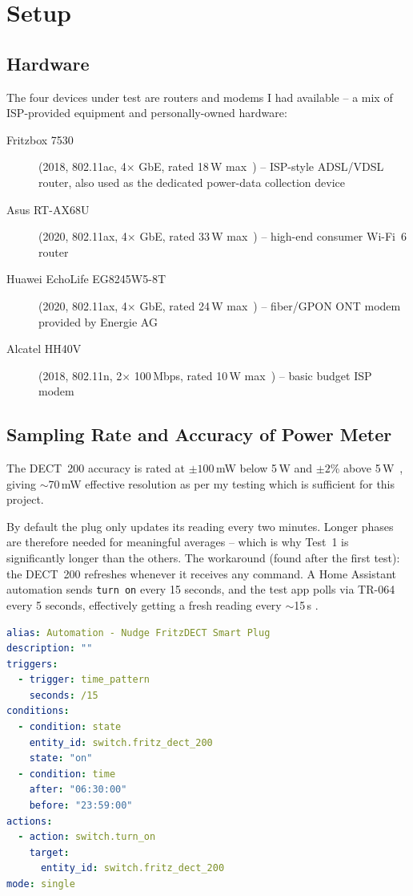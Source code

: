 \documentclass[a4paper,oneside,10pt,ngerman,english]{scrartcl}
\begin{document}
\section{Setup}
\label{sec:setup}
    \subsection{Hardware}
    The four devices under test are routers and modems I had available -- a mix of \ac{ISP}-provided equipment and personally-owned hardware:
    \begin{description}
        \item[Fritzbox 7530] (2018, 802.11ac, 4$\times$ \ac{GbE}, rated 18\,W max~\cite{bib:datasheet-fritzbox7530}) -- \ac{ISP}-style ADSL/VDSL router, also used as the dedicated power-data collection device
        \item[Asus RT-AX68U] (2020, 802.11ax, 4$\times$ \ac{GbE}, rated 33\,W max~\cite{bib:datasheet-asus-rtax68u}) -- high-end consumer Wi-Fi~6 router
        \item[Huawei EchoLife EG8245W5-8T] (2020, 802.11ax, 4$\times$ \ac{GbE}, rated 24\,W max~\cite{bib:datasheet-huawei-eg8245}) -- fiber/GPON \ac{ONT} modem provided by Energie AG
        \item[Alcatel HH40V] (2018, 802.11n, 2$\times$ 100\,Mbps, rated 10\,W max~\cite{bib:datasheet-alcatel-hh40v}) -- basic budget \ac{ISP} modem
    \end{description}
    \subsection{Sampling Rate and Accuracy of Power Meter}
    The \ac{DECT}~200 accuracy is rated at $\pm 100$\,mW below 5\,W and $\pm 2$\% above 5\,W~\cite{bib:dect200}, giving $\sim$70\,mW effective resolution as per my testing which is sufficient for this project.

    By default the plug only updates its reading every two minutes. Longer phases are therefore needed for meaningful averages -- which is why Test~1 is significantly longer than the others. The workaround (found after the first test): the \ac{DECT}~200 refreshes whenever it receives any command. A Home Assistant automation sends \verb|turn on| every 15 seconds, and the test app polls via TR-064 every 5 seconds, effectively getting a fresh reading every $\sim$15\,s \cite{ha-dect-workaround}.
    \begin{lstlisting}[language=yaml]
alias: Automation - Nudge FritzDECT Smart Plug
description: ""
triggers:
  - trigger: time_pattern
    seconds: /15
conditions:
  - condition: state
    entity_id: switch.fritz_dect_200
    state: "on"
  - condition: time
    after: "06:30:00"
    before: "23:59:00"
actions:
  - action: switch.turn_on
    target:
      entity_id: switch.fritz_dect_200
mode: single
    \end{lstlisting}
\end{document}
